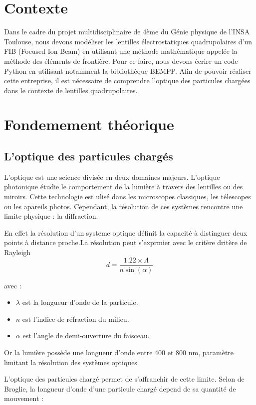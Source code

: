 \documentclass{report}
\begin{document}
\section{Contexte}
Dans le cadre du projet multidisciplinaire de 4ème du Génie physique de l'INSA Toulouse, nous devons modéliser les lentilles électrostatiques quadrupolaires 
d'un FIB (Focused Ion Beam) en utilisant une méthode mathématique appelée la méthode des éléments de frontière. Pour ce faire, nous devons écrire un code Python 
en utilisant notamment la bibliothèque BEMPP. Afin de pouvoir réaliser cette entreprise, il est nécessaire de comprendre l'optique des particules chargées dans le contexte
de lentilles quadrupolaires. 

\section{Fondemement théorique}

\subsection{L'optique des particules chargés}

L'optique est une science divisée en deux domaines majeurs. L'optique photonique étudie le comportement de la lumière
 à travers des lentilles ou des miroirs. Cette technologie est ulisé dans les microscopes classiques, les télescopes
 ou les apareils photos.
Cependant, la résolution de ces systèmes rencontre une limite physique : la diffraction.

En effet la résolution d'un systeme optique définit la capacité à distinguer deux points à distance proche.La résolution
peut s'exprmier avec le critère dritère de Rayleigh
\[
d = \frac{1.22 \times \Lambda}{n\sin(\alpha)}
\]

avec :

\begin{itemize}
    \item $\lambda$ est la longueur d'onde de la particule.
    \item $n$ est l'indice de réfraction du milieu.
    \item $\alpha$ est l'angle de demi-ouverture du faisceau.
\end{itemize} 

 Or la lumière possède une longueur d'onde entre 400 et 800 nm,
paramètre limitant la résolution des systèmes optiques. 

L'optique des particules chargé permet de s'affranchir de cette limite. Selon de Broglie, la longueur d'onde d'une
particule chargé depend de sa quantité de mouvement :
\end{document}

